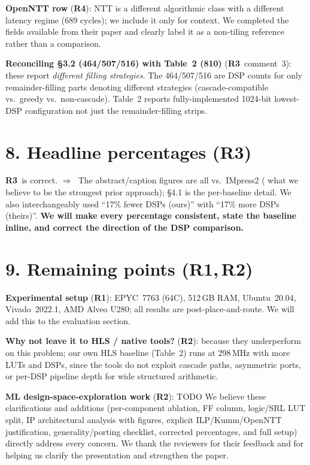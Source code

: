 \documentclass[10pt]{article}
\newcommand{\Ra}{\textbf{\textcolor{c1}{R1}}}
\newcommand{\Rb}{\textbf{\textcolor{c2}{R2}}}
\newcommand{\Rc}{\textbf{\textcolor{c3}{R3}}}
\newcommand{\Rd}{\textbf{\textcolor{c4}{R4}}}
\newcommand{\ans}{\textbf{$\Rightarrow$~}}
\begin{document}
\textbf{OpenNTT row} (\Rd): NTT is a different algorithmic class with a different latency regime (689 cycles); we include it only for context.
We  completed the fields available from their paper and clearly label it as a non-tiling reference rather than a comparison.

\textbf{Reconciling \S3.2 (464/507/516) with Table~2 (810)} (\Rc\ comment~3): these report \emph{different filling strategies}.
The 464/507/516 are DSP counts for only remainder-filling parts denoting different strategies (cascade-compatible vs.\ greedy vs.\ non-cascade). 
Table~2 reports fully-implemented 1024-bit lowest-DSP configuration not just the remainder-filling strips.

\section*{8. Headline percentages \hfill {\normalsize(\Rc)}}

\Rc\ is correct.
\ans The abstract/caption figures are all vs.\ IMpress2 ( what we believe to be the strongest prior approach); \S4.1 is the per-baseline detail.
We also interchangeably used  ``17\% fewer DSPs (ours)'' with ``17\% more DSPs (theirs)''.
\textbf{We will make every percentage consistent, state the baseline inline, and correct the direction of the DSP comparison.}

\section*{9. Remaining points \hfill {\normalsize(\Ra,\,\Rb)}}

\textbf{Experimental setup} (\Ra): EPYC~7763 (64C), 512\,GB RAM, Ubuntu~20.04, Vivado~2022.1, AMD Alveo U280; all results are post-place-and-route.
We will add this to the evaluation section.

\textbf{Why not leave it to HLS / native tools?} (\Rb): because they underperform on this problem; our own HLS baseline (Table~2) runs at 298\,MHz with more LUTs and DSPs, since the tools do not exploit cascade paths, asymmetric ports, or per-DSP pipeline depth for wide structured arithmetic.

\textbf{ML design-space-exploration work} (\Rb): TODO
\medskip
We believe these clarifications and additions (per-component ablation, FF column, logic/SRL LUT split, IP architectural analysis with figures, explicit ILP/Kumm/OpenNTT justification, generality/porting checklist, corrected percentages, and full setup) directly address every concern.
We thank the reviewers for their feedback and for helping us clarify the presentation and strengthen the paper.
\end{document}
